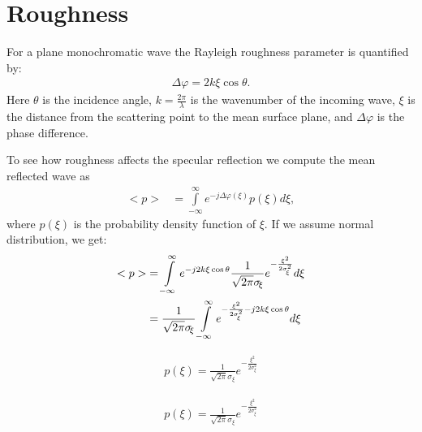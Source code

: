 
\newpage

\section{Roughness}

For a plane monochromatic wave the Rayleigh roughness parameter is quantified by:
\begin{align}
\Delta\varphi = 2k\xi\cos\theta.
\end{align}
Here $\theta$ is the incidence angle, $k = \frac{2\pi}{\lambda}$ is the wavenumber of the incoming wave, $\xi$ is the distance from the scattering point to the mean surface plane, and $\Delta\varphi$ is the phase difference.

\begin{figure}[th]
\end{figure}

To see how roughness affects the specular reflection we compute the mean reflected wave as
\begin{align}
<p> &= \int\limits_{-\infty}^{\infty} e^{-j\Delta\varphi(\xi)} p(\xi) d\xi,
\end{align}
where $p(\xi)$ is the probability density function of $\xi$. If we assume normal distribution, we get:
\begin{align}
<p> &= \int\limits_{-\infty}^{\infty} e^{-j2k\xi\cos\theta} \frac{1}{\sqrt{2\pi}\sigma_{\!\xi}}e^{-\frac{\xi^2}{2\sigma_{\!\xi}^2}} d\xi \nonumber\\
&= \frac{1}{\sqrt{2\pi}\sigma_{\!\xi}} \int\limits_{-\infty}^{\infty} e^{-\frac{\xi^2}{2\sigma_{\!\xi}^2}-j2k\xi\cos\theta} d\xi \nonumber\\
\end{align}

\begin{align}
p(\xi) = \frac{1}{\sqrt{2\pi}\sigma_{\!\xi}}e^{-\frac{\xi^2}{2\sigma_{\!\xi}^2}}
\end{align}


\begin{align}
p(\xi) = \frac{1}{\sqrt{2\pi}\sigma_{\!\xi}}e^{-\frac{\xi^2}{2\sigma_{\!\xi}^2}}
\end{align}

